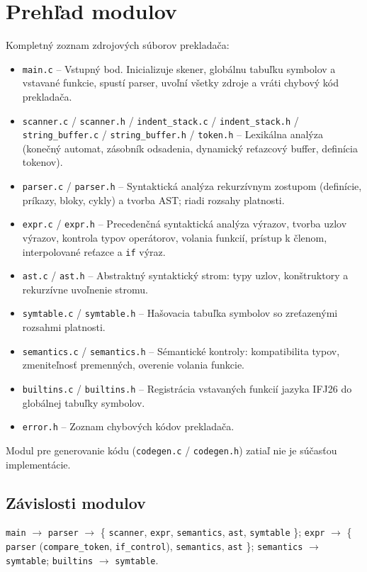 \section{Prehľad modulov}
Kompletný zoznam zdrojových súborov prekladača:
\begin{itemize}
    \item \texttt{main.c} -- Vstupný bod. Inicializuje skener, globálnu tabuľku symbolov a vstavané funkcie, spustí parser, uvoľní všetky zdroje a vráti chybový kód prekladača.
    \item \texttt{scanner.c} / \texttt{scanner.h} / \texttt{indent\_stack.c} / \texttt{indent\_stack.h} / \texttt{string\_buffer.c} / \texttt{string\_buffer.h} / \texttt{token.h} -- Lexikálna analýza (konečný automat, zásobník odsadenia, dynamický reťazcový buffer, definícia tokenov).
    \item \texttt{parser.c} / \texttt{parser.h} -- Syntaktická analýza rekurzívnym zostupom (definície, príkazy, bloky, cykly) a tvorba AST; riadi rozsahy platnosti.
    \item \texttt{expr.c} / \texttt{expr.h} -- Precedenčná syntaktická analýza výrazov, tvorba uzlov výrazov, kontrola typov operátorov, volania funkcií, prístup k členom, interpolované reťazce a \texttt{if} výraz.
    \item \texttt{ast.c} / \texttt{ast.h} -- Abstraktný syntaktický strom: typy uzlov, konštruktory a rekurzívne uvoľnenie stromu.
    \item \texttt{symtable.c} / \texttt{symtable.h} -- Hašovacia tabuľka symbolov so zreťazenými rozsahmi platnosti.
    \item \texttt{semantics.c} / \texttt{semantics.h} -- Sémantické kontroly: kompatibilita typov, zmeniteľnosť premenných, overenie volania funkcie.
    \item \texttt{builtins.c} / \texttt{builtins.h} -- Registrácia vstavaných funkcií jazyka IFJ26 do globálnej tabuľky symbolov.
    \item \texttt{error.h} -- Zoznam chybových kódov prekladača.
\end{itemize}
Modul pre generovanie kódu (\texttt{codegen.c} / \texttt{codegen.h}) zatiaľ nie je súčasťou implementácie.

\subsection{Závislosti modulov}
\begin{center}
\texttt{main} $\rightarrow$ \texttt{parser} $\rightarrow$ \{ \texttt{scanner}, \texttt{expr}, \texttt{semantics}, \texttt{ast}, \texttt{symtable} \}; \quad \texttt{expr} $\rightarrow$ \{ \texttt{parser} (\texttt{compare\_token}, \texttt{if\_control}), \texttt{semantics}, \texttt{ast} \}; \quad \texttt{semantics} $\rightarrow$ \texttt{symtable}; \quad \texttt{builtins} $\rightarrow$ \texttt{symtable}.
\end{center}